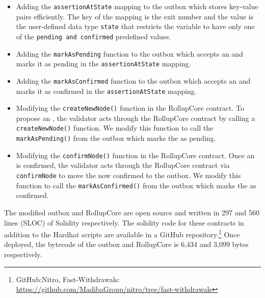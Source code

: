 \begin{itemize}
\item Adding the \texttt{assertionAtState} mapping to the outbox which stores key-value pairs efficiently. The key of the mapping is the exit number and the value is the user-defined data type \texttt{state} that restricts the variable to have only one of the \texttt{pending and confirmed} predefined values.
\item Adding the \texttt{markAsPending} function to the outbox which accepts an \rblock and marks it as pending in the \texttt{assertionAtState} mapping.
\item Adding the \texttt{markAsConfirmed} function to the outbox which accepts an \rblock and marks it as confirmed in the \texttt{assertionAtState} mapping.
\item Modifying the \texttt{createNewNode()} function in the RollupCore contract. To propose an \rblock, the validator acts through the RollupCore contract by calling a \texttt{createNewNode()} function. We modify this function to call the \texttt{markAsPending()} from the outbox which marks the \rblock as pending.
\item Modifying the \texttt{confirmNode()} function in the RollupCore contract. Once an \rblock is confirmed, the validator acts through the RollupCore contract via \texttt{confirmNode} to move the now confirmed \rblock to the outbox. We modify this function to call the \texttt{markAsConfirmed()} from the outbox which marks the \rblock as confirmed.
\end{itemize}

The modified outbox and RollupCore are open source and written in 297 and 560  lines (SLOC) of Solidity respectively. The solidity code for these contracts in addition to the Hardhat scripts are available in a GitHub repository.\footnote{GitHub:Nitro, Fast-Withdrawals: \url{https://github.com/MadibaGroup/nitro/tree/fast-withdrawals}} Once deployed, the bytecode of the outbox and RollupCore is 6,434 and 3,099 bytes respectively.





